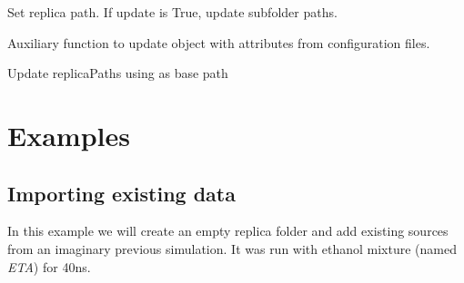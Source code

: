 \documentclass[letterpaper,10pt,english]{sphinxmanual}
\begin{document}
\begin{fulllineitems}
\begin{fulllineitems}
\end{fulllineitems}


\begin{fulllineitems}
\label{replicas:pyMDMix.Replicas.Replica.setPath}
Set replica path. If update is True, update subfolder paths.

\end{fulllineitems}


\begin{fulllineitems}
\label{replicas:pyMDMix.Replicas.Replica.updateFromSettings}
Auxiliary function to update object with attributes from configuration files.

\end{fulllineitems}


\begin{fulllineitems}
\label{replicas:pyMDMix.Replicas.Replica.updatePaths}
Update replicaPaths using  as base path

\end{fulllineitems}


\end{fulllineitems}



\section{Examples}
\label{replicas:examples}

\subsection{Importing existing data}
\label{replicas:importing-existing-data}
In this example we will create an empty replica folder and add existing
sources from an imaginary previous simulation. It was run with ethanol mixture (named \emph{ETA}) for 40ns.
\end{document}
